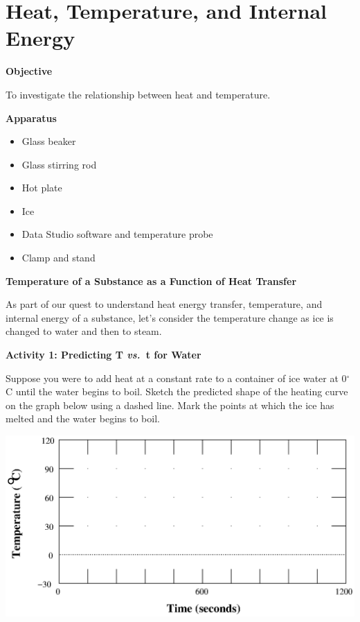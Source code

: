 
\section{Heat, Temperature, and Internal Energy}

\makelabheader %

\textbf{Objective}

To investigate the relationship between heat and temperature.

\textbf{Apparatus}

\begin{itemize}
\item Glass beaker 
\item Glass stirring rod
\item Hot plate
\item Ice
\item Data Studio software and temperature probe
\item Clamp and stand
\end{itemize}
\textbf{Temperature of a Substance as a Function of Heat Transfer}

As part of our quest to understand heat energy transfer, temperature,
and internal energy of a substance, let's consider the temperature
change as ice is changed to water and then to steam.

\textbf{Activity 1: Predicting T \textit{vs.}~t for Water} 

Suppose you were to add heat at a constant rate to a container of
ice water at 0\( ^{\circ } \)C until the water begins to boil. Sketch
the predicted shape of the heating curve on the graph below using
a dashed line. Mark the points at which the ice has melted and the
water begins to boil.

\vspace{0.3cm}
{\centering \includegraphics{heat_temp_int_energy/heat_temp_int_energy_fig_1.eps} \par}
\vspace{0.3cm}

